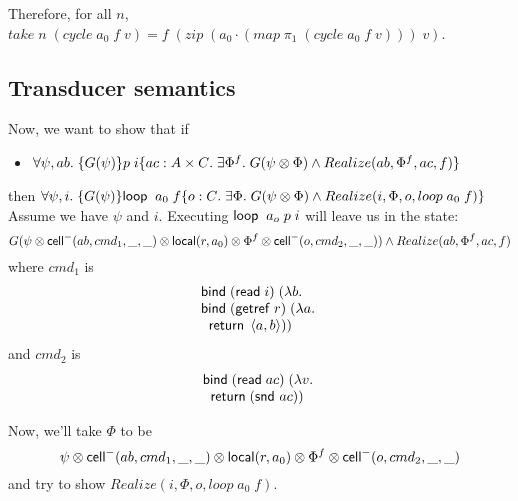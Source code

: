 \documentclass{article}
\begin{document}
Therefore, for all $n$, $take\;n\;(cycle\;a_0\;f\;v) = f\;(zip\;(a_0\cdot(map\;\pi_1\;(cycle\;a_0\;f\;v)))\;v)$. 

\subsection{Transducer semantics}

Now, we want to show that if 

\begin{itemize}
\item $\forall \psi, ab.\; \{{G(\psi)}\}{p\;i}\{{ac:A\times C}.\;{\exists \Phi^f.\; G(\psi \otimes \Phi) \land Realize(ab, \Phi^f, ac, f)}\}$
\end{itemize}
then $\forall \psi, i.\; \{{G(\psi)}\}{\mbox{\textsf{{loop}}}\;\;a_0\;f}\{{o:C}.\;{\exists \Phi.\; G(\psi \otimes \Phi) \land Realize(i, \Phi, o, loop\;a_0\;f)}\}$ \\

Assume we have $\psi$ and $i$. Executing $\mbox{\textsf{{loop}}}\;\;a_o\;p\;i$ will leave us in the state: 
\begin{displaymath}
  G(\psi \otimes \mbox{\textsf{{cell}}}^{-}({ab}, {cmd_1}, {\_}, {\_}) \otimes \mbox{\textsf{{local}}}({r}, {a_0}) \otimes \Phi^f \otimes \mbox{\textsf{{cell}}}^{-}({o}, {cmd_2}, {\_}, {\_})) \land Realize(ab, \Phi^f, ac, f)
\end{displaymath}
where $cmd_1$ is 
\begin{displaymath}
  \begin{array}{l}
    \mbox{\textsf{{bind}}}\; (\mbox{\textsf{{read}}}\; i) \;(\lambda b.\;  \\
    \mbox{\textsf{{bind}}}\; (\mbox{\textsf{{getref}}}\; r)   \;(\lambda a.\;  \\ 
    \;\;\mbox{\textsf{{return}}}\; \left<{a},{b}\right>)) \\
  \end{array}
\end{displaymath}
and $cmd_2$ is 
\begin{displaymath}
  \begin{array}{l}
    \mbox{\textsf{{bind}}}\; (\mbox{\textsf{{read}}}\; ac) \;(\lambda v.\; \\
    \;\;\mbox{\textsf{{return}}}\; (\mbox{\textsf{{snd }}} ac)) \\
  \end{array}
\end{displaymath}

\noindent Now, we'll take $\Phi$ to be 
\begin{displaymath}
  \psi \otimes \mbox{\textsf{{cell}}}^{-}({ab}, {cmd_1}, {\_}, {\_}) \otimes \mbox{\textsf{{local}}}({r}, {a_0}) \otimes \Phi^f \otimes \mbox{\textsf{{cell}}}^{-}({o}, {cmd_2}, {\_}, {\_})
\end{displaymath}
and try to show $Realize(i, \Phi, o, loop\;a_0\;f)$. 
\end{document}
